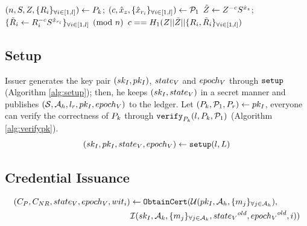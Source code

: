 \documentclass{article}
\begin{document}
\begin{algorithm}
\caption{$\mt{verify}_{\pk }(l, \pk , \pl )$}
\label{alg:verifypk}
\begin{algorithmic}
	\State $(n, S, Z, \{{R_i}\}_{\forall i\in [{1, {l}}] }) \leftarrow P_{k} $; $(c, \hat{x}_{z}, \{{ \hat{x}_{r_{i}}}\}_{\forall i\in [{1, {l}}] }) \leftarrow \mathcal{P}_{1} $
	\State $\tilde{Z}_{}\leftarrow Z_{}^{-c}S^{\hat{x}{_{z}}}$; $\{{\tilde{R}_{i}\leftarrow R_{i}^{-c}S^{\hat{x}{_{r_{i}}}}}\}_{\forall i\in [{1, {l}}] }\pmod{n}$
	\State \Return $c==H_{1}(Z||\tilde{Z}||\{{R_i,\tilde{R}_i}\}_{\forall i\in [{1, {l}}] })$
\end{algorithmic}
\end{algorithm}

\subsection{Setup}
Issuer generates the key pair $(sk_{I}, pk_{I})$, $state_{V} $ and $epoch_{V} $ through $\mathtt{setup}$ (Algorithm \ref{alg:setup}); then, he keeps $(sk_{I}, state_{V} )$ in a secret manner and publishes $(\mathcal{S}, \mathcal{A}_{h} , l_{r}, pk_{I}, epoch_{V} )$ to the ledger. Let $(P_{k} , \mathcal{P}_{1} , P_{r} ) \leftarrow pk_{I}$, everyone can verify the correctness of $P_{k} $ through $\mt{verify}_{\pk }(l, \pk , \pl )$ (Algorithm \ref{alg:verifypk}).
\begin{equation}
	(sk_{I}, pk_{I}, state_{V} , epoch_{V} ) \leftarrow \mathtt{setup}(l, L)
\end{equation}



\subsection{Credential Issuance}
\begin{align*}
	(C_{P} , C_{NR}, state_{V}, epoch_{V}, wit_{i} )&\leftarrow \mathtt{ObtainCert}(\mathcal{U}(pk_I, \mathcal{A}_{h}, \{{m_{j}}\}_{\forall j\in \mathcal{A}_{h} }), \\
	&\mathcal{I}(sk_{I}, \mathcal{A}_{k}, \{{m_{j}}\}_{\forall j\in \mathcal{A}_{k} }, {state_{V} }^{old}, {epoch_{V} }^{old},i))
\end{align*}
\end{document}
